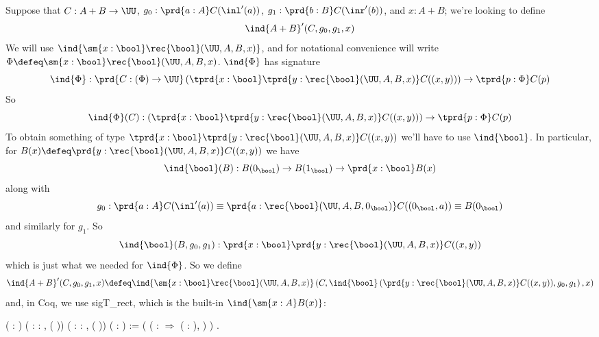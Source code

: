 Suppose that $C : A + B \to \UU$, $g_{0} : \prd{a:A} C(\inl'(a))$, $g_{1} :
\prd{b:B} C(\inr'(b))$, and $x : A+B$; we're looking to define
\[
  \ind{A+B}'(C, g_{0}, g_{1}, x)
\]
We will use $\ind{\sm{x:\bool}\rec{\bool}(\UU, A, B, x)}$, and for notational
convenience will write $\Phi \defeq \sm{x:\bool}\rec{\bool}(\UU, A, B, x)$.
$\ind{\Phi}$ has signature
\[
  \ind{\Phi} :
  \prd{C : (\Phi) \to \UU}
  \left(\tprd{x:\bool}\tprd{y:\rec{\bool}(\UU, A, B, x)}C((x, y))\right)
  \to
  \tprd{p:\Phi} C(p)
\]
So
\[
  \ind{\Phi}(C) : 
  \left(\tprd{x:\bool}\tprd{y:\rec{\bool}(\UU, A, B, x)}C((x, y))\right)
  \to
  \tprd{p:\Phi} C(p)
\]
To obtain something of type $\tprd{x:\bool}\tprd{y:\rec{\bool}(\UU, A, B,
  x)}C((x, y))$ we'll have to use $\ind{\bool}$.  In particular, for $B(x)
\defeq\prd{y:\rec{\bool}(\UU, A, B, x)}C((x, y))$ we have
\[
  \ind{\bool}(B)
  :
  B(0_{\bool})
  \to
  B(1_{\bool})
  \to
  \prd{x:\bool}
  B(x)
\]
along with
\[
  g_{0} :
  \prd{a:A} C(\inl'(a))
  \equiv
  \prd{a:\rec{\bool}(\UU, A, B, 0_{\bool})} C((0_{\bool}, a))
  \equiv
  B(0_{\bool})
\]
and similarly for $g_{1}$.  So
\[
  \ind{\bool}(B, g_{0}, g_{1}) : \prd{x:\bool}\prd{y:\rec{\bool}(\UU, A, B, x)}
  C((x, y))
\]
which is just what we needed for $\ind{\Phi}$.  So we define
\[
  \ind{A+B}'(C, g_{0}, g_{1}, x)
  \defeq
  \ind{\sm{x:\bool}\rec{\bool}(\UU, A, B, x)}\left(
    C,
    \ind{\bool}\left(
      \prd{y:\rec{\bool}(\UU, A, B, x)} C((x, y)),
      g_{0},
      g_{1}
    \right),
    x
  \right)
\]
and, in Coq, we use sigT\_rect, which is the built-in
$\ind{\sm{x:A}B(x)}$: \begin{coqdoccode}
\coqdocemptyline
\coqdocindent{1.00em}
  ( :   ) ( : \coqdockw{\ensuremath{\forall}}  : ,  ( )) ( : \coqdockw{\ensuremath{\forall}}  : ,  ( )) ( : ) := \coqdoceol
\coqdocindent{2.00em}
  \coqdoceol
\coqdocindent{7.00em}
( ( : \ensuremath{\Rightarrow} \coqdockw{\ensuremath{\forall}} ( :      ),  \coqdocnotation{(}\coqdocnotation{;} \coqdocnotation{)}) \coqdoceol
\coqdocindent{12.50em}
 \coqdoceol
\coqdocindent{12.50em}
) \coqdoceol
\coqdocindent{7.00em}
.\coqdoceol
\coqdocemptyline
\end{coqdoccode}


